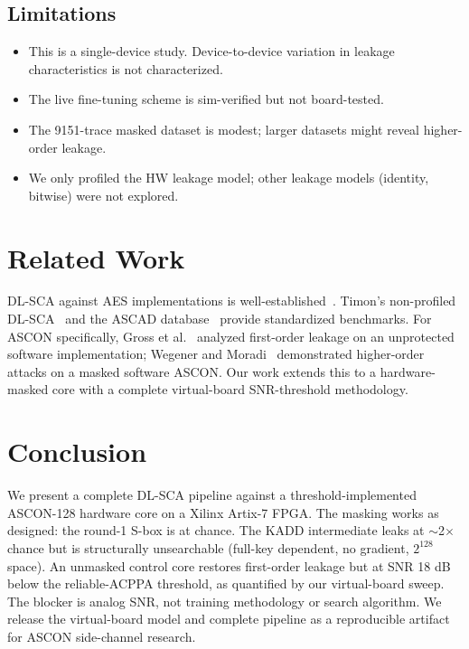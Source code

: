 \documentclass[a4paper,11pt,twocolumn]{article}
\begin{document}
\subsection{Limitations}

\begin{itemize}[leftmargin=*,nosep]
\item This is a single-device study. Device-to-device variation in leakage characteristics is not characterized.
\item The live fine-tuning scheme is sim-verified but not board-tested.
\item The 9151-trace masked dataset is modest; larger datasets might reveal higher-order leakage.
\item We only profiled the HW leakage model; other leakage models (identity, bitwise) were not explored.
\end{itemize}

\section{Related Work}

DL-SCA against AES implementations is well-established~\cite{dlsca_survey}. Timon's non-profiled DL-SCA~\cite{timon2019} and the ASCAD database~\cite{ascad} provide standardized benchmarks. For ASCON specifically, Gross et al.~\cite{gross_ascon} analyzed first-order leakage on an unprotected software implementation; Wegener and Moradi~\cite{wegener_ascon} demonstrated higher-order attacks on a masked software ASCON. Our work extends this to a hardware-masked core with a complete virtual-board SNR-threshold methodology.

\section{Conclusion}

We present a complete DL-SCA pipeline against a threshold-implemented ASCON-128 hardware core on a Xilinx Artix-7 FPGA. The masking works as designed: the round-1 S-box is at chance. The KADD intermediate leaks at $\sim$2$\times$ chance but is structurally unsearchable (full-key dependent, no gradient, $2^{128}$ space). An unmasked control core restores first-order leakage but at SNR 18 dB below the reliable-ACPPA threshold, as quantified by our virtual-board sweep. The blocker is analog SNR, not training methodology or search algorithm. We release the virtual-board model and complete pipeline as a reproducible artifact for ASCON side-channel research.
\end{document}
